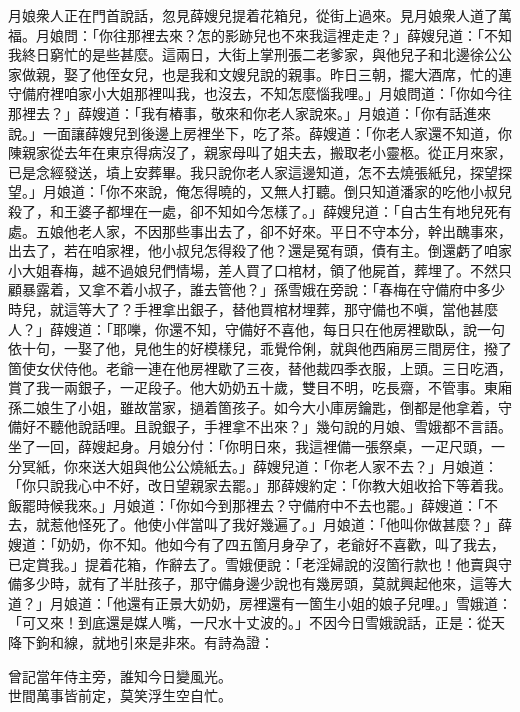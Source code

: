 月娘衆人正在門首說話，忽見薛嫂兒提着花箱兒，從街上過來。見月娘衆人道了萬福。月娘問：「你往那裡去來？怎的影跡兒也不來我這裡走走？」薛嫂兒道：「不知我終日窮忙的是些甚麼。這兩日，大街上掌刑張二老爹家，與他兒子和北邊徐公公家做親，娶了他侄女兒，也是我和文嫂兒說的親事。昨日三朝，擺大酒席，忙的連守備府裡咱家小大姐那裡叫我，也沒去，不知怎麼惱我哩。」月娘問道：「你如今往那裡去？」薛嫂道：「我有樁事，敬來和你老人家說來。」月娘道：「你有話進來說。」一面讓薛嫂兒到後邊上房裡坐下，吃了茶。薛嫂道：「你老人家還不知道，你陳親家從去年在東京得病沒了，親家母叫了姐夫去，搬取老小靈柩。從正月來家，已是念經發送，墳上安葬畢。我只說你老人家這邊知道，怎不去燒張紙兒，探望探望。」月娘道：「你不來說，俺怎得曉的，又無人打聽。{}倒只知道潘家的吃他小叔兒殺了，和王婆子都埋在一處，卻不知如今怎樣了。」薛嫂兒道：「自古生有地兒死有處。五娘他老人家，不因那些事出去了，卻不好來。平日不守本分，幹出醜事來，出去了，若在咱家裡，他小叔兒怎得殺了他？還是冤有頭，債有主。倒還虧了咱家小大姐春梅，越不過娘兒們情場，差人買了口棺材，領了他屍首，葬埋了。不然只顧暴露着，又拿不着小叔子，誰去管他？」孫雪娥在旁說：「春梅在守備府中多少時兒，就這等大了？手裡拿出銀子，替他買棺材埋葬，那守備也不嗔，當他甚麼人？」{}薛嫂道：「耶嚛，你還不知，守備好不喜他，每日只在他房裡歇臥，說一句依十句，一娶了他，見他生的好模樣兒，乖覺伶俐，就與他西廂房三間房住，撥了箇使女伏侍他。老爺一連在他房裡歇了三夜，替他裁四季衣服，上頭。三日吃酒，賞了我一兩銀子，一疋段子。他大奶奶五十歲，雙目不明，吃長齋，不管事。東廂孫二娘生了小姐，雖故當家，撾着箇孩子。如今大小庫房鑰匙，倒都是他拿着，守備好不聽他說話哩。且說銀子，手裡拿不出來？」{}幾句說的月娘、雪娥都不言語。坐了一回，薛嫂起身。月娘分付：「你明日來，我這裡備一張祭桌，一疋尺頭，一分冥紙，你來送大姐與他公公燒紙去。」薛嫂兒道：「你老人家不去？」月娘道：「你只說我心中不好，改日望親家去罷。」{}那薛嫂約定：「你教大姐收拾下等着我。飯罷時候我來。」月娘道：「你如今到那裡去？守備府中不去也罷。」薛嫂道：「不去，就惹他怪死了。他使小伴當叫了我好幾遍了。」月娘道：「他叫你做甚麼？」薛嫂道：「奶奶，你不知。他如今有了四五箇月身孕了，老爺好不喜歡，叫了我去，已定賞我。」提着花箱，作辭去了。雪娥便說：「老淫婦說的沒箇行款也！他賣與守備多少時，就有了半肚孩子，那守備身邊少說也有幾房頭，莫就興起他來，這等大道？」{}月娘道：「他還有正景大奶奶，房裡還有一箇生小姐的娘子兒哩。」雪娥道：「可又來！到底還是媒人嘴，一尺水十丈波的。」不因今日雪娥說話，正是：從天降下鉤和線，就地引來是非來。有詩為證：

\begin{myquote}
曾記當年侍主旁，誰知今日變風光。\\世間萬事皆前定，莫笑浮生空自忙。
\end{myquote}

